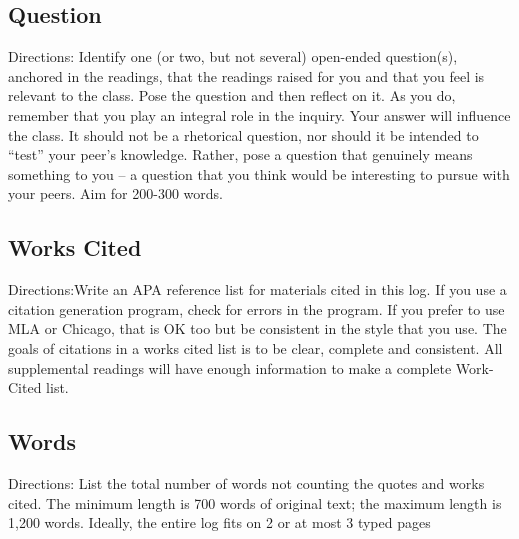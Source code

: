 \documentclass[12pt,a4paper,man,natbib]{apa6}
\begin{document}
\subsection{Question}

Directions:  Identify one (or two, but not several) open-ended question(s), anchored in the readings, that the readings raised for you and that you feel is relevant to the class.  Pose the question and then reflect on it. As you do, remember that you play an integral role in the inquiry. Your answer will influence the class. It should not be a rhetorical question, nor should it be intended to “test” your peer’s knowledge. Rather, pose a question that genuinely means something to you – a question that you think would be interesting to pursue with your peers.  Aim for 200-300 words.

\subsection{Works Cited}

Directions:Write an APA reference list for materials cited in this log.  If you use a citation generation program, check for errors in the program.  If you prefer to use MLA or Chicago, that is OK too but be consistent in the style that you use.  The goals of citations in a works cited list is to be clear, complete and consistent.  All supplemental readings will have enough information to make a complete Work-Cited list.

\subsection{Words}

Directions: List the total number of words not counting the quotes and works cited.  The minimum length is 700 words of original text; the maximum length is 1,200 words. Ideally, the entire log fits on 2 or at most 3 typed pages \cite{BobsBook01}




\end{document}
